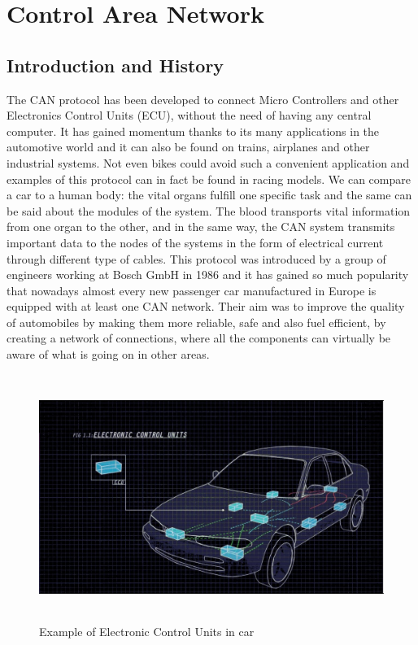 \documentclass{article}
\begin{document}
 

\section{Control Area Network}
\subsection{Introduction and History}
The CAN protocol has been developed to connect Micro Controllers and other Electronics Control Units (ECU), without the need of having any central computer. It has gained momentum thanks to its many applications in the automotive world and it can also be found on trains, airplanes and other industrial systems. Not even bikes could avoid such a convenient application and examples of this protocol can in fact be found in racing models.  
\newline
\newline
We can compare a car to a human body: the vital organs fulfill one specific task and the same can be said about the modules of the system. The blood transports vital information from one organ to the other, and in the same way,  the CAN system transmits important data to the nodes of the systems in the form of electrical current through different type of cables. 
\newline
\newline
This protocol was introduced by a group of engineers working at Bosch GmbH in 1986 and it has gained so much  popularity that nowadays almost every new passenger car manufactured in Europe is equipped with at least one CAN network. Their aim was to improve the quality of automobiles by making them more reliable, safe and also fuel efficient, by creating a network of connections, where all the components can virtually be aware of what is going on in other areas. 

\begin{figure}[h]    
    \centering
    \includegraphics[width=13cm, height=8cm,center]{images/can_car}
    \caption{Example of Electronic Control Units in car}
\end{figure}
\end{document}
